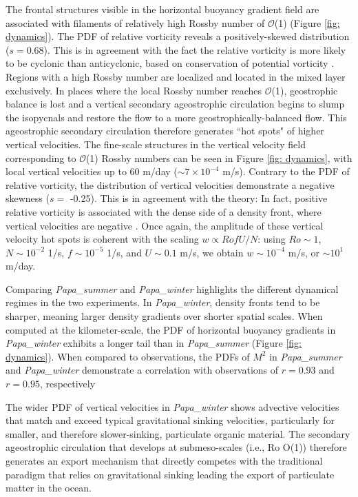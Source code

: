 \documentclass[draft,linenumbers]{agujournal2018}
\begin{document}
The frontal structures visible in the horizontal buoyancy gradient field are associated with filaments of relatively high Rossby number of $\mathcal{O}$(1) (Figure \ref{fig: dynamics}). The PDF of relative vorticity reveals a positively-skewed distribution ($s = 0.68$). This is in agreement with the fact the relative vorticity is more likely to be cyclonic than anticyclonic, based on conservation of potential vorticity \citep{Hoskins_1972}. Regions with a high Rossby number are localized and located in the mixed layer exclusively. In places where the local Rossby number reaches $\mathcal{O}$(1), geostrophic balance is lost and a vertical secondary ageostrophic circulation begins to slump the isopycnals and restore the flow to a more geostrophically-balanced flow. This ageostrophic secondary circulation therefore generates ``hot spots" of higher vertical velocities. The fine-scale structures in the vertical velocity field corresponding to $\mathcal{O}$(1) Rossby numbers  can be seen in Figure \ref{fig: dynamics}, with local vertical velocities up to 60 m/day ($\sim 7\times10^{-4}$ m/s). Contrary to the PDF of relative vorticity, the distribution of vertical velocities demonstrate a negative skewness ($s =$ -0.25). This is in agreement with the theory: In fact, positive relative vorticity is associated with the dense side of a density front, where vertical velocities are negative \citep{Mahadevan_2016}. Once again, the amplitude of these vertical velocity hot spots is coherent with the scaling $w \propto RofU/N$: using $Ro\sim1$, $N\sim10^{-2}$ 1/s, $f\sim10^{-5}$ 1/s, and $U\sim0.1$ m/s, we obtain $w\sim 10^{-4}$ m/s, or $\sim 10^{1}$ m/day. %

Comparing \textit{Papa\_summer} and \textit{Papa\_winter} highlights the different dynamical regimes in the two experiments. In \textit{Papa\_winter}, density fronts tend to be sharper, meaning larger density gradients over shorter spatial scales. When computed at the kilometer-scale, the PDF of horizontal buoyancy gradients in \textit{Papa\_winter} exhibits a longer tail than in \textit{Papa\_summer} (Figure \ref{fig: dynamics}). When compared to observations, the PDFs of $M^2$ in \textit{Papa\_summer} and \textit{Papa\_winter} demonstrate a correlation with observations of $r = 0.93$ and $r = 0.95$, respectively


The wider PDF of vertical velocities in \textit{Papa\_winter} shows advective velocities that match and exceed typical gravitational sinking velocities, particularly for smaller, and therefore slower-sinking, particulate organic material. The secondary ageostrophic circulation that develops at submeso-scales (i.e., Ro O(1)) therefore generates an export mechanism that directly competes with the traditional paradigm that relies on gravitational sinking leading the export of particulate matter in the ocean.
\end{document}
